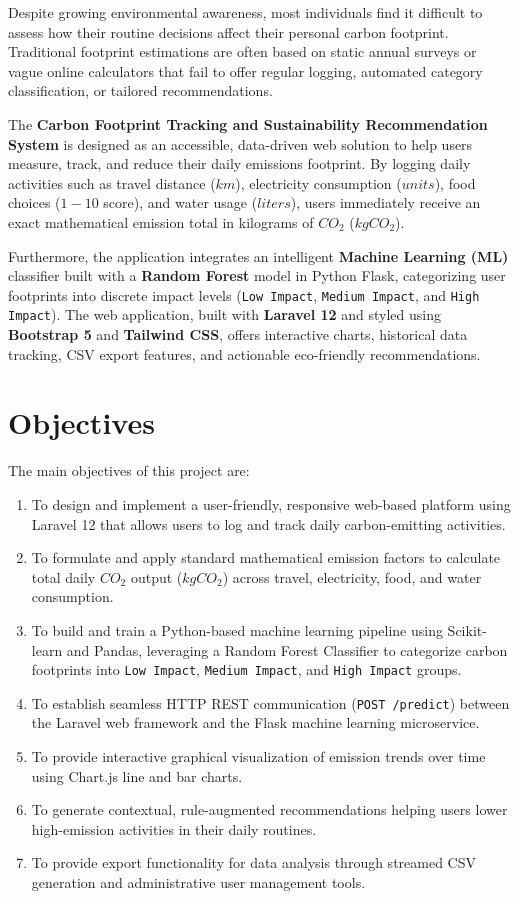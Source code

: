 \documentclass[12pt,a4paper]{report}
\begin{document}
Despite growing environmental awareness, most individuals find it difficult to assess how their routine decisions affect their personal carbon footprint. Traditional footprint estimations are often based on static annual surveys or vague online calculators that fail to offer regular logging, automated category classification, or tailored recommendations.

The \textbf{Carbon Footprint Tracking and Sustainability Recommendation System} is designed as an accessible, data-driven web solution to help users measure, track, and reduce their daily emissions footprint. By logging daily activities such as travel distance ($km$), electricity consumption ($units$), food choices ($1-10$ score), and water usage ($liters$), users immediately receive an exact mathematical emission total in kilograms of $CO_2$ ($kg CO_2$).

Furthermore, the application integrates an intelligent \textbf{Machine Learning (ML)} classifier built with a \textbf{Random Forest} model in Python Flask, categorizing user footprints into discrete impact levels (\texttt{Low Impact}, \texttt{Medium Impact}, and \texttt{High Impact}). The web application, built with \textbf{Laravel 12} and styled using \textbf{Bootstrap 5} and \textbf{Tailwind CSS}, offers interactive charts, historical data tracking, CSV export features, and actionable eco-friendly recommendations.

\section{Objectives}
The main objectives of this project are:
\begin{enumerate}
    \item To design and implement a user-friendly, responsive web-based platform using Laravel 12 that allows users to log and track daily carbon-emitting activities.
    \item To formulate and apply standard mathematical emission factors to calculate total daily $CO_2$ output ($kg CO_2$) across travel, electricity, food, and water consumption.
    \item To build and train a Python-based machine learning pipeline using Scikit-learn and Pandas, leveraging a Random Forest Classifier to categorize carbon footprints into \texttt{Low Impact}, \texttt{Medium Impact}, and \texttt{High Impact} groups.
    \item To establish seamless HTTP REST communication (\texttt{POST /predict}) between the Laravel web framework and the Flask machine learning microservice.
    \item To provide interactive graphical visualization of emission trends over time using Chart.js line and bar charts.
    \item To generate contextual, rule-augmented recommendations helping users lower high-emission activities in their daily routines.
    \item To provide export functionality for data analysis through streamed CSV generation and administrative user management tools.
\end{enumerate}
\end{document}
